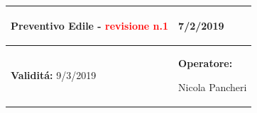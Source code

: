 \documentclass[a4paper]{article}
\begin{document}
                          \begin{center}
                          \begin{tabular}{|L{89mm} R{60mm}| }
                          \hline
                          \vspace{2.5mm}
                          \begin{spacing}{0}
                        \textbf{Preventivo Edile - } \textcolor{red}{revisione n.1}
                          \end{spacing}&
                          \vspace{2.5mm}
                          \begin{spacing}{0}

                        7/2/2019

                          \end{spacing}\\
                          \hline
                          \vspace{2.5mm}
                          \begin{spacing}{0}
                          
                        
                                \textbf{Validit\'a:}
                           9/3/2019
                          \end{spacing} &
                          \vspace{2.5mm}
                          \begin{spacing}{0}
                            \textbf{Operatore:}

                       Nicola Pancheri
                          \end{spacing} \\
                          \hline
                          \end{tabular}
                          \end{center}
                       
\end{document}
